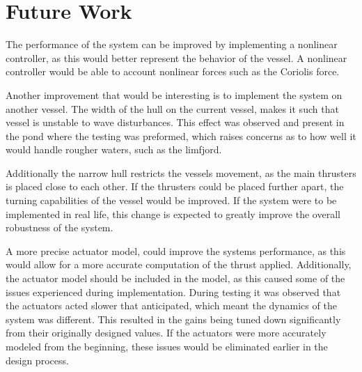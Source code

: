 \chapter{Future Work}

The performance of the system can be improved by implementing a nonlinear controller, as this would better represent the behavior of the vessel. 
A nonlinear controller would be able to account nonlinear forces such as the Coriolis force. 


Another improvement that would be interesting is to implement the system on another vessel. 
The width of the hull on the current vessel, makes it such that vessel is unstable to wave disturbances. 
This effect was observed and present in the pond where the testing was preformed, which raises concerns as to how well it would handle rougher waters, such as the limfjord. 

Additionally the narrow hull restricts the vessels movement, as the main thrusters is placed close to each other. 
If the thrusters could be placed further apart, the turning capabilities of the vessel would be improved. 
If the system were to be implemented in real life, this change is expected to greatly improve the overall robustness of the system. 

A more precise actuator model, could improve the systems performance, as this would allow for a more accurate computation of the thrust applied. 
Additionally, the actuator model should be included in the model, as this caused some of the issues experienced during implementation. 
During testing it was observed that the actuators acted slower that anticipated, which meant the dynamics of the system was different. 
This resulted in the gains being tuned down significantly from their originally designed values. 
If the actuators were more accurately modeled from the beginning, these issues would be eliminated earlier in the design process. 


